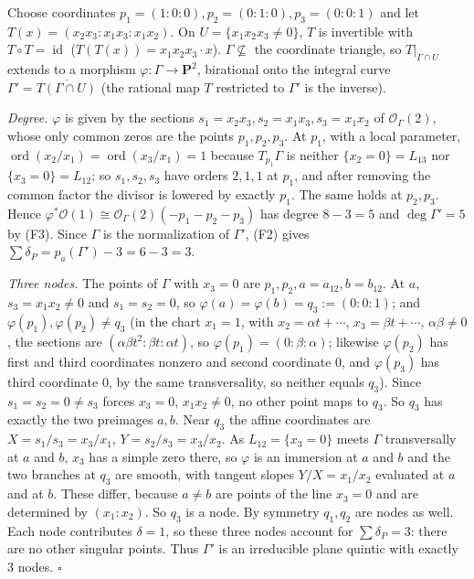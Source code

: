 \documentclass[11pt]{article}
\begin{document}
Choose coordinates $p_1=(1:0:0),p_2=(0:1:0),p_3=(0:0:1)$ and let $T(x)=(x_2x_3:x_1x_3:x_1x_2)$. On $U=\{x_1x_2x_3\ne0\}$, $T$ is invertible with $T\circ T=\operatorname{id}$ ($T(T(x))=x_1x_2x_3\cdot x$). $\Gamma\not\subseteq$ the coordinate triangle, so $T|_{\Gamma\cap U}$ extends to a morphism $\varphi:\Gamma\to\mathbf P^2$, birational onto the integral curve $\Gamma'=\overline{T(\Gamma\cap U)}$ (the rational map $T$ restricted to $\Gamma'$ is the inverse).

\emph{Degree.} $\varphi$ is given by the sections $s_1=x_2x_3,s_2=x_1x_3,s_3=x_1x_2$ of $\mathcal O_\Gamma(2)$, whose only common zeros are the points $p_1,p_2,p_3$. At $p_1$, with a local parameter, $\operatorname{ord}(x_2/x_1)=\operatorname{ord}(x_3/x_1)=1$ because $T_{p_1}\Gamma$ is neither $\{x_2=0\}=L_{13}$ nor $\{x_3=0\}=L_{12}$; so $s_1,s_2,s_3$ have orders $2,1,1$ at $p_1$, and after removing the common factor the divisor is lowered by exactly $p_1$. The same holds at $p_2,p_3$. Hence $\varphi^*\mathcal O(1)\cong\mathcal O_\Gamma(2)(-p_1-p_2-p_3)$ has degree $8-3=5$ and $\deg\Gamma'=5$ by (F3). Since $\Gamma$ is the normalization of $\Gamma'$, (F2) gives $\sum\delta_P=p_a(\Gamma')-3=6-3=3$.

\emph{Three nodes.} The points of $\Gamma$ with $x_3=0$ are $p_1,p_2,a=a_{12},b=b_{12}$. At $a$, $s_3=x_1x_2\ne0$ and $s_1=s_2=0$, so $\varphi(a)=\varphi(b)=q_3:=(0:0:1)$; and $\varphi(p_1),\varphi(p_2)\ne q_3$ (in the chart $x_1=1$, with $x_2=\alpha t+\cdots$, $x_3=\beta t+\cdots$, $\alpha\beta\ne0$, the sections are $(\alpha\beta t^2:\beta t:\alpha t)$, so $\varphi(p_1)=(0:\beta:\alpha)$; likewise $\varphi(p_2)$ has first and third coordinates nonzero and second coordinate $0$, and $\varphi(p_3)$ has third coordinate $0$, by the same transversality, so neither equals $q_3$). Since $s_1=s_2=0\ne s_3$ forces $x_3=0$, $x_1x_2\ne0$, no other point maps to $q_3$. So $q_3$ has exactly the two preimages $a,b$. Near $q_3$ the affine coordinates are $X=s_1/s_3=x_3/x_1$, $Y=s_2/s_3=x_3/x_2$. As $L_{12}=\{x_3=0\}$ meets $\Gamma$ transversally at $a$ and $b$, $x_3$ has a simple zero there, so $\varphi$ is an immersion at $a$ and $b$ and the two branches at $q_3$ are smooth, with tangent slopes $Y/X=x_1/x_2$ evaluated at $a$ and at $b$. These differ, because $a\ne b$ are points of the line $x_3=0$ and are determined by $(x_1:x_2)$. So $q_3$ is a node. By symmetry $q_1,q_2$ are nodes as well. Each node contributes $\delta=1$, so these three nodes account for $\sum\delta_P=3$: there are no other singular points. Thus $\Gamma'$ is an irreducible plane quintic with exactly $3$ nodes. \hfill$\square$
\end{document}
